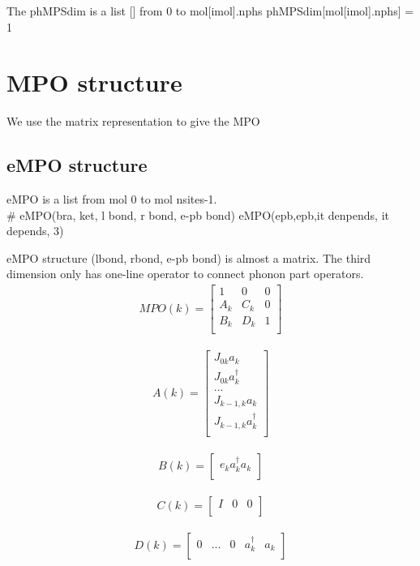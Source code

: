 \documentclass[a4paper,11pt]{ctexart}
\begin{document}
The phMPSdim is a list [] from 0 to mol[imol].nphs
phMPSdim[mol[imol].nphs] = 1
    

\section{MPO structure}
We use the matrix representation to give the MPO
\subsection{eMPO structure}
eMPO is a list from mol 0 to mol nsites-1. \\
\# eMPO(bra, ket, l bond, r bond, e-pb bond)
eMPO(epb,epb,it denpends, it depends, 3)

eMPO structure (lbond, rbond, e-pb bond) is almost a matrix.
The third dimension only has one-line operator to connect phonon part operators.
\begin{gather}
MPO(k) = 
\begin{bmatrix}
    1 & 0 & 0  \\
    A_k & C_k & 0  \\
    B_k & D_k & 1  \\
\end{bmatrix}
\end{gather}

\begin{gather}
A(k) = 
\begin{bmatrix}
    J_{0k} a_k  \\
    J_{0k} a^\dagger_k \\
    ...  \\
    J_{k-1,k} a_k  \\
    J_{k-1,k} a^\dagger_k \\
\end{bmatrix}
\end{gather}

\begin{gather}
B(k) = 
\begin{bmatrix}
    e_k a^\dagger_k a_k \\
\end{bmatrix}
\end{gather}

\begin{gather}
C(k) = 
\begin{bmatrix}
    I & 0 & 0 \\ 
\end{bmatrix}
\end{gather}

\begin{gather}
D(k) = 
\begin{bmatrix}
    0 & ... & 0 & a^\dagger_k & a_k  \\ 
\end{bmatrix}
\end{gather}
\end{document}
